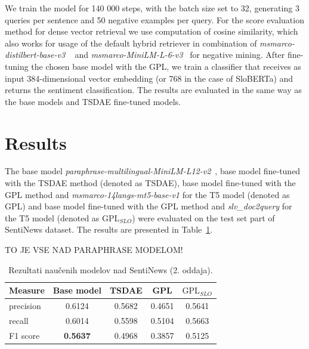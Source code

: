 \documentclass[fleqn,moreauthors,10pt]{ds_report}
\begin{document}
We train the model for 140 000 steps, with the batch size set to 32, generating 3 queries per sentence and 50 negative examples per query. For the score evaluation method for dense vector retrieval we use computation of cosine similarity, which also works for usage of the default hybrid retriever in combination of {\it msmarco-distilbert-base-v3 }~\cite{msmarcodistil} and {\it msmarco-MiniLM-L-6-v3}~\cite{msmarcominilm} for negative mining. After fine-tuning the chosen base model with the GPL, we train a classifier that receives as input 384-dimensional vector embedding (or 768 in the case of SloBERTa) and returns the sentiment classification. The results are evaluated in the same way as the base models and TSDAE fine-tuned models.





\section*{Results}


The base model {\it paraphrase-multilingual-MiniLM-L12-v2}~\cite{reimers-2019-sentence-bert}, base model fine-tuned with the TSDAE method (denoted as TSDAE), base model fine-tuned with the GPL method and {\it msmarco-14langs-mt5-base-v1} \cite{msmarco14langs} for the T5 model (denoted as GPL) and base model fine-tuned with the GPL method and {\it slv\_doc2query} \cite{boshko} for the T5 model (denoted as $\text{GPL}_{SLO}$) were evaluated on the test set part of SentiNews dataset. The results are presented in Table~\ref{tab2}.

TO JE VSE NAD PARAPHRASE MODELOM!

\begin{table}[!h]
	\footnotesize
	\begin{center}
		\begin{tabular}{ |l|c|c|c|c| }
		\hline
		\rowcolor{Red}Measure & Base model & TSDAE & GPL & $\text{GPL}_{SLO}$ \\
		\hline

		precision & 0.6124 & 0.5682 & 0.4651 & 0.5641 \\
		recall & 0.6014 & 0.5598 & 0.5104 & 0.5663 \\
		F1 score & \textbf{0.5637} & 0.4968 & 0.3857 & 0.5125 \\

		\hline
		\end{tabular}
	\end{center}
\caption{Rezultati naučenih modelov nad SentiNews \cite{sentiNews} (2. oddaja).}
\label{tab2}
\end{table}
\end{document}
